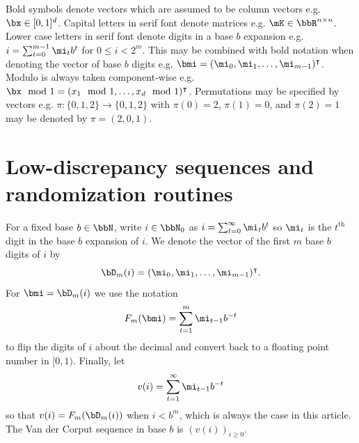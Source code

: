 \documentclass[acmsmall]{acmart}
\begin{document}
Bold symbols denote vectors which are assumed to be column vectors e.g. $\bx \in [0,1]^d$. Capital letters in serif font denote matrices e.g. $\mK \in \bbR^{n \times n}$. Lower case letters in serif font denote digits in a base $b$ expansion e.g. $i = \sum_{t=0}^{m-1} \mi_t b^t$ for $0 \leq i < 2^m$. This may be combined with bold notation when denoting the vector of base $b$ digits e.g. $\bmi = (\mi_0,\mi_1,\dots,\mi_{m-1})^\intercal$. Modulo is always taken component-wise e.g. $\bx \mod 1 = (x_1 \mod 1,\dots,x_d \mod 1)^\intercal$. Permutations may be specified by vectors e.g. $\pi: \{0,1,2\} \to \{0,1,2\}$ with $\pi(0) = 2$, $\pi(1) = 0$, and $\pi(2)=1$ may be denoted by $\pi = (2,0,1)$. 

\section{Low-discrepancy sequences and randomization routines} \label{sec:LD_seq_and_randomizations}

For a fixed base $b \in \bbN$, write $i \in \bbN_0$ as $i = \sum_{t=0}^\infty \mi_t b^t$ so $\mi_t$ is the $t^\mathrm{th}$ digit in the base $b$ expansion of $i$. We denote the vector of the first $m$ base $b$ digits of $i$ by
$$\bD_m(i) = (\mi_0,\mi_1,\dots,\mi_{m-1})^\intercal.$$
For $\bmi = \bD_m(i)$ we use the notation 
$$F_m(\bmi) = \sum_{t=1}^m \mi_{t-1} b^{-t}$$
to flip the digits of $i$ about the decimal and convert back to a floating point number in $[0,1)$. Finally, let
\begin{equation}
    v(i) = \sum_{t=1}^\infty \mi_{t-1} b^{-t}
    \label{eq:v}
\end{equation}
so that $v(i) = F_m(\bD_m(i))$ when $i < b^m$, which is always the case in this article. The Van der Corput sequence in base $b$ is $(v(i))_{i \geq 0}$.
\end{document}
